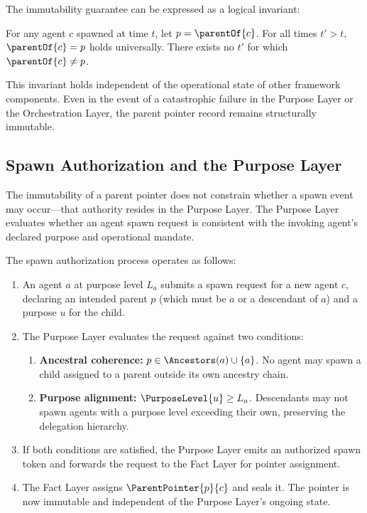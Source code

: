 The immutability guarantee can be expressed as a logical invariant:

\begin{invariant}
For any agent $c$ spawned at time $t$, let $p = \parentOf{c}$. For all times $t' > t$, $\parentOf{c} = p$ holds universally. There exists no $t'$ for which $\parentOf{c} \neq p$.
\end{invariant}

This invariant holds independent of the operational state of other framework components. Even in the event of a catastrophic failure in the Purpose Layer or the Orchestration Layer, the parent pointer record remains structurally immutable.

\subsection{Spawn Authorization and the Purpose Layer}

The immutability of a parent pointer does not constrain whether a spawn event may occur—that authority resides in the Purpose Layer. The Purpose Layer evaluates whether an agent spawn request is consistent with the invoking agent's declared purpose and operational mandate.

The spawn authorization process operates as follows:

\begin{algorithm}[H]
\caption{Spawn Authorization at the Purpose Layer}
\label{alg:spawn-authorization}
\begin{enumerate}
    \item An agent $a$ at purpose level $L_a$ submits a spawn request for a new agent $c$, declaring an intended parent $p$ (which must be $a$ or a descendant of $a$) and a purpose $u$ for the child.
    \item The Purpose Layer evaluates the request against two conditions:
    \begin{enumerate}
        \itemsep 0.2em
        \item \textbf{Ancestral coherence:} $p \in \Ancestors(a) \cup \{a\}$. No agent may spawn a child assigned to a parent outside its own ancestry chain.
        \item \textbf{Purpose alignment:} $\PurposeLevel{u} \geq L_a$. Descendants may not spawn agents with a purpose level exceeding their own, preserving the delegation hierarchy.
    \end{enumerate}
    \item If both conditions are satisfied, the Purpose Layer emits an authorized spawn token and forwards the request to the Fact Layer for pointer assignment.
    \item The Fact Layer assigns $\ParentPointer{p}{c}$ and seals it. The pointer is now immutable and independent of the Purpose Layer's ongoing state.
\end{enumerate}
\end{algorithm}

